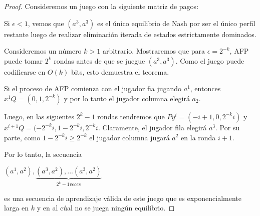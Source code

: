 \begin{proof}
    Consideremos un juego con la siguiente matriz de pagos:

    

    Si $\epsilon < 1$, vemos que $(a^3, a^3)$ es el único
    equilibrio de Nash por ser el único perfil restante luego de realizar eliminación iterada de estados estrictamente dominados.

    Consideremos un número $k > 1$ arbitrario. Mostraremos que para $\epsilon = 2^{-k}$, AFP puede tomar $2^k$ rondas antes de que
    se juegue $(a^3, a^3)$. Como el juego puede codificarse en $O(k)$ bits, esto demuestra el teorema.

    Si el proceso de AFP comienza con el jugador fia jugando $a^1$, entonces $x^1Q = (0, 1, 2^{-k})$ y por lo tanto
    el jugador columna elegirá $a_2$.

    Luego, en las siguentes $2^k - 1$ rondas tendremos que $Py^i = (-i + 1, 0, 2^{-k}i)$ y $x^{i+1}Q = (-2^{-k}i, 1 - 2^{-k}i, 2^{-k}i$.
    Claramente, el jugador fila elegirá $a^3$. Por su parte, como $1 - 2^{-k}i \ge 2^{-k}$ el jugador columna jugará $a^2$ en la ronda $i + 1$.

    Por lo tanto, la secuencia

    \begin{math}
        (a^1, a^2), \underbrace{(a^3, a^2), ... (a^3, a^2)}_{2^k - 1 veces}
    \end{math}

    es una secuencia de aprendizaje válida de este juego que es exponencialmente larga en $k$ y en al cúal no se juega ningún equilibrio.
\end{proof}